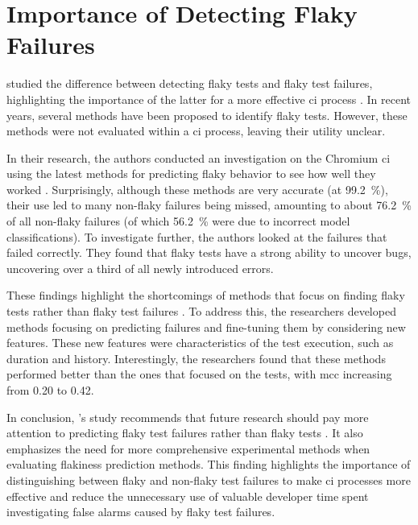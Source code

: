 \section{Importance of Detecting Flaky Failures}
 studied the difference between detecting flaky tests and flaky test failures, highlighting the importance of the latter for a more effective \ac{ci} process \autocite{haben_importance_2023}.
In recent years, several methods have been proposed to identify flaky tests.
However, these methods were not evaluated within a \ac{ci} process, leaving their utility unclear.

In their research, the authors conducted an investigation on the Chromium \ac{ci} using the latest methods for predicting flaky behavior to see how well they worked \autocite{haben_importance_2023}. 
Surprisingly, although these methods are very accurate (at \SI{99.2}{\percent}), their use led to many non-flaky failures being missed, amounting to about \SI{76.2}{\percent} of all non-flaky failures (of which \SI{56.2}{\percent} were due to incorrect model classifications).
To investigate further, the authors looked at the failures that failed correctly. 
They found that flaky tests have a strong ability to uncover bugs, uncovering over a third of all newly introduced errors.

These findings highlight the shortcomings of methods that focus on finding flaky tests rather than flaky test failures \autocite{haben_importance_2023}. 
To address this, the researchers developed methods focusing on predicting failures and fine-tuning them by considering new features. 
These new features were characteristics of the test execution, such as duration and history. 
Interestingly, the researchers found that these methods performed better than the ones that focused on the tests, with \ac{mcc} increasing from \num{0.20} to \num{0.42}.

In conclusion, \citeauthor*{haben_importance_2023}'s study recommends that future research should pay more attention to predicting flaky test failures rather than flaky tests \autocite{haben_importance_2023}. 
It also emphasizes the need for more comprehensive experimental methods when evaluating flakiness prediction methods. 
This finding highlights the importance of distinguishing between flaky and non-flaky test failures to make \ac{ci} processes more effective and reduce the unnecessary use of valuable developer time spent investigating false alarms caused by flaky test failures.

